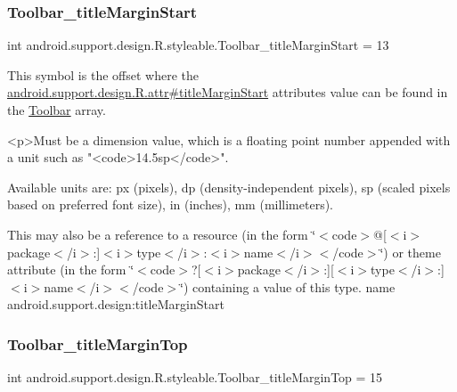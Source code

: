 \subsubsection{\texorpdfstring{Toolbar\+\_\+title\+Margin\+Start}{Toolbar\_titleMarginStart}}
{\footnotesize\ttfamily int android.\+support.\+design.\+R.\+styleable.\+Toolbar\+\_\+title\+Margin\+Start = 13\hspace{0.3cm}{\ttfamily [static]}}

This symbol is the offset where the \hyperlink{classandroid_1_1support_1_1design_1_1R_1_1attr_aadfb6a3ca430a7444ffb6de0d2c8c5d9}{android.\+support.\+design.\+R.\+attr\#title\+Margin\+Start} attribute\textquotesingle{}s value can be found in the \hyperlink{classandroid_1_1support_1_1design_1_1R_1_1styleable_a7783ebe780dbe2a845802a40519a46e9}{Toolbar} array.

\begin{DoxyVerb}      <p>Must be a dimension value, which is a floating point number appended with a unit such as "<code>14.5sp</code>".
\end{DoxyVerb}
 Available units are\+: px (pixels), dp (density-\/independent pixels), sp (scaled pixels based on preferred font size), in (inches), mm (millimeters). 

This may also be a reference to a resource (in the form \char`\"{}$<$code$>$@\mbox{[}$<$i$>$package$<$/i$>$\+:\mbox{]}$<$i$>$type$<$/i$>$\+:$<$i$>$name$<$/i$>$$<$/code$>$\char`\"{}) or theme attribute (in the form \char`\"{}$<$code$>$?\mbox{[}$<$i$>$package$<$/i$>$\+:\mbox{]}\mbox{[}$<$i$>$type$<$/i$>$\+:\mbox{]}$<$i$>$name$<$/i$>$$<$/code$>$\char`\"{}) containing a value of this type.  name android.\+support.\+design\+:title\+Margin\+Start \mbox{\label{classandroid_1_1support_1_1design_1_1R_1_1styleable_a29bca0a3147a1442fad7801b4d23fc68}} 
\subsubsection{\texorpdfstring{Toolbar\+\_\+title\+Margin\+Top}{Toolbar\_titleMarginTop}}
{\footnotesize\ttfamily int android.\+support.\+design.\+R.\+styleable.\+Toolbar\+\_\+title\+Margin\+Top = 15\hspace{0.3cm}{\ttfamily [static]}}

